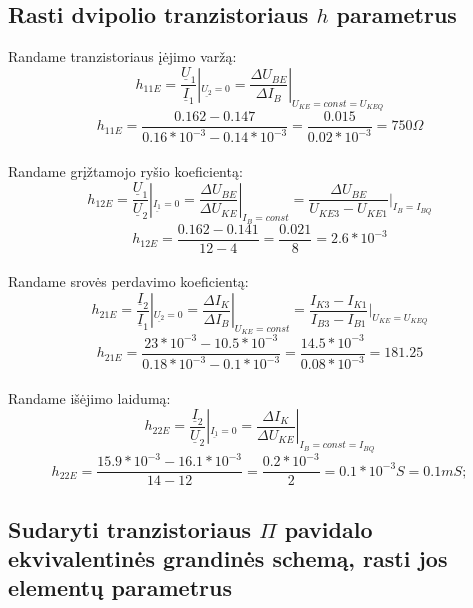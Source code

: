 \documentclass[11pt,a4paper]{article}
\begin{document}
\subsection{Rasti dvipolio tranzistoriaus $h$ parametrus}
Randame tranzistoriaus įėjimo varžą:
\begin{equation}
h_{11E} = \frac{\underline{U}_1}{\underline{I}_1}|_{\underline{U_2} = 0}
= \frac{\Delta U_{BE}}{\Delta I_B}| _{U_{KE} = const = U_{KEQ}}
\end{equation}
\[
h_{11E} = \frac{0.162-0.147}{0.16*10^{-3}-0.14*10^{-3}} = \frac{0.015}{0.02*10^{-3}} = 750 \Omega
\]\\
Randame grįžtamojo ryšio koeficientą:
\begin{equation}
h_{12E} = \frac{\underline{U}_1}{\underline{U}_2}|_{\underline{I_{1}} = 0} = \frac{\Delta U_{BE}}{\Delta U_{KE}}|_{I_{B} = const} = \frac{\Delta U_{BE}}{U_{KE3} - U_{KE1}} |_{I_B = I_{BQ}}
\end{equation}
\[
h_{12E} = \frac{0.162-0.141}{12-4} = \frac{0.021}{8} = 2.6*10^{-3}
\]\\
Randame srovės perdavimo koeficientą:
\begin{equation}
h_{21E} = \frac{\underline{I}_2}{\underline{I}_1} |_{\underline{U_{2}} = 0} = 
\frac{\Delta I_{K}}{\Delta I_{B}} |_{U_{KE} = const} = 
\frac{I_{K3} - I_{K1}}{I_{B3} - I_{B1}} |_{U_{KE} = U_{KEQ}}
\end{equation}
\[
h_{21E} = \frac{23*10^{-3}-10.5*10^{-3}}{0.18*10^{-3}-0.1*10^{-3}} = \frac{14.5*10^{-3}}{0.08*10^{-3}} = 181.25
\]\\
Randame išėjimo laidumą:
\begin{equation}
h_{22E} = \frac{\underline{I}_2}{\underline{U}_2} |_{\underline{I_1} = 0} = \frac{\Delta I_K}{\Delta U_{KE}} |_{I_B = const = I_{BQ}}
\end{equation}
\[
h_{22E} = \frac{15.9*10^{-3}-16.1*10^{-3}}{14-12} = \frac{0.2*10^{-3}}{2} = 0.1*10^{-3} S = 0.1 mS;
\]

\subsection{Sudaryti tranzistoriaus $\Pi$ pavidalo ekvivalentinės grandinės schemą, rasti jos elementų parametrus}
\end{document}
